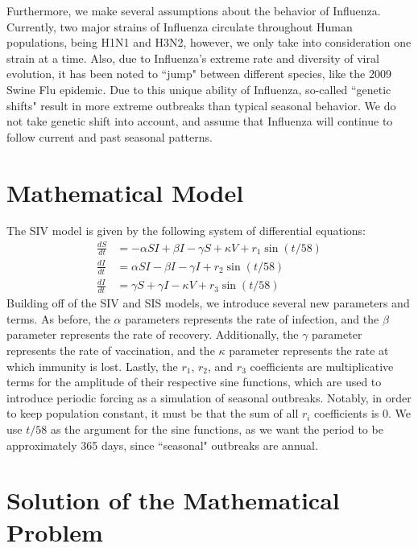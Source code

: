 \documentclass[11pt]{article}
\begin{document}
Furthermore, we make several assumptions about the behavior of Influenza. Currently, two major strains of Influenza circulate throughout Human populations, being H1N1 and H3N2, however, we only take into consideration one strain at a time. Also, due to Influenza's extreme rate and diversity of viral evolution, it has been noted to ``jump" between different species, like the 2009 Swine Flu epidemic. Due to this unique ability of Influenza, so-called ``genetic shifts" result in more extreme outbreaks than typical seasonal behavior. We do not take genetic shift into account, and assume that Influenza will continue to follow current and past seasonal patterns.

\section*{Mathematical Model}

The SIV model is given by the following system of differential equations:
\begin{equation}
\begin{aligned}
\frac{dS}{dt} &= -\alpha S I + \beta I - \gamma S + \kappa V + r_1\sin(t / 58)\\
\frac{dI}{dt} &= \alpha S I - \beta I - \gamma I + r_2\sin(t / 58)\\
\frac{dI}{dt} &= \gamma S + \gamma I - \kappa V + r_3\sin(t / 58)
\end{aligned}
\end{equation}
Building off of the SIV and SIS models, we introduce several new parameters and terms. As before, the $\alpha$ parameters represents the rate of infection, and the $\beta$ parameter represents the rate of recovery. Additionally, the $\gamma$ parameter represents the rate of vaccination, and the $\kappa$ parameter represents the rate at which immunity is lost. Lastly, the $r_1$, $r_2$, and $r_3$ coefficients are multiplicative terms for the amplitude of their respective sine functions, which are used to introduce periodic forcing as a simulation of seasonal outbreaks. Notably, in order to keep population constant, it must be that the sum of all $r_i$ coefficients is $0$. We use $t / 58$ as the argument for the sine functions, as we want the period to be approximately 365 days, since ``seasonal" outbreaks are annual.

\section*{Solution of the Mathematical Problem}
\end{document}
